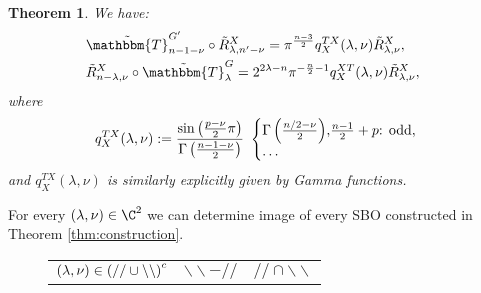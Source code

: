 \documentclass[portrait,final,paperwidth=90cm,paperheight=120cm,fontscale=0.3]{baposter}
\newcommand{\assign}{:=}
\newcommand{\mybox}[2]{
	\begin{tcolorbox}[colback=green!5,colframe=green!40!black,title=#1]#2\end{tcolorbox}
}
\newtheorem{theorem}{Theorem}
\theoremstyle{definition}
\newcommand{\todd}{\mbox{\textrm{: odd}}}
\begin{document}
\begin{poster}
{\begin{theorem}
		We have:
\begin{eqnarray}
    & \tilde{\mathbbm{T}}^{G'}_{n-1 - \nu} \circ \tilde{R}^X_{\lambda, n' - \nu} =\pi^{\frac{n - 3}{2}} q^{T X}_X
  (\lambda, \nu) \tilde{R}^X_{\lambda, \nu}, &  \nonumber\\
  & \tilde{R}_{n - \lambda, \nu}^X \circ \tilde{\mathbbm{T}}^G_{\lambda} =2^{2\lambda-n}\pi^{-\frac{n}{2}-1} q^{X T}_X
  (\lambda, \nu) \tilde{R}_{\lambda, \nu}^X, &  \nonumber
  \end{eqnarray}
  where
  \begin{gather*}
  q^{T X}_X (\lambda, \nu) \assign\frac{\sin\left( \frac{p-\nu}{2} \pi\right)}{\Gamma\left( \frac{n-1-\nu}{2} \right)} \ \left\{
	  \begin{array}{@{}l@{}l}
    {\Gamma\left( \frac{n / 2 - \nu}{2} \right)}, & \frac{n - 1}{2}+p\todd,\\
    \dots&
  \end{array} \right.
\end{gather*}
and $q_X^{TX}(\lambda,\nu)$ is similarly explicitly given by Gamma functions.
	\end{theorem}
}
{
	For every $(\lambda,\nu)\in\C^2$ we can determine image of every SBO constructed in Theorem \ref{thm:construction}.
	\mybox{{\hspace{-0.55cm}Example: Images of $\tilde{R}_{\lambda,\nu}^X$ for $p$:even, $q$:odd, $\nu\kern-0.1cm\in\kern-0.1cm-\N$\hspace{-0.05cm}}}{{\tiny
      \begin{figure}[H]
	      \vspace{-0.4cm}
	      \hspace{-0.65cm}
	      \renewcommand{\Sp}{\mathbb{S}}
	      \begin{tabular}{@{}c@{}c@{}c@{}}
		      $(\lambda,\nu)\in\left(//\cup\backslash\backslash\right)^c$ & $\backslash\backslash-//$  & $//\cap\backslash\backslash$\\[0.4cm]
	      
      \end{tabular}
      \end{figure}
      }}
}

\end{poster}
\end{document}
